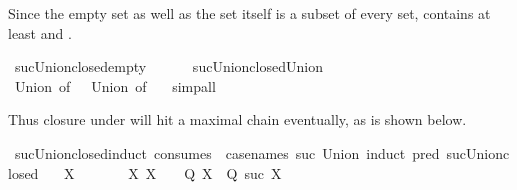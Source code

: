 \begin{isabellebody}
\begin{isamarkuptext}%
Since the empty set as well as the set itself is a subset of
  every set, \isa{{\isasymC}} contains at least \isa{{\isacharbraceleft}{\kern0pt}{\isacharbraceright}{\kern0pt}\ {\isasymin}\ {\isasymC}} and
  \isa{{\isasymUnion}\ {\isasymC}\ {\isasymin}\ {\isasymC}}.%
\end{isamarkuptext}\isamarkuptrue%
\isamarkupfalse%
\ suc{\isacharunderscore}{\kern0pt}Union{\isacharunderscore}{\kern0pt}closed{\isacharunderscore}{\kern0pt}empty{\isacharcolon}{\kern0pt}\ {\isachardoublequoteopen}{\isacharbraceleft}{\kern0pt}{\isacharbraceright}{\kern0pt}\ {\isasymin}\ {\isasymC}{\isachardoublequoteclose}\isanewline
\ \ \ suc{\isacharunderscore}{\kern0pt}Union{\isacharunderscore}{\kern0pt}closed{\isacharunderscore}{\kern0pt}Union{\isacharcolon}{\kern0pt}\ {\isachardoublequoteopen}{\isasymUnion}{\isasymC}\ {\isasymin}\ {\isasymC}{\isachardoublequoteclose}\isanewline
%
\isadelimproof
\ \ %
\endisadelimproof
%
\isatagproof
{}\isamarkupfalse%
\ Union\ {\isacharbrackleft}{\kern0pt}of\ {\isachardoublequoteopen}{\isacharbraceleft}{\kern0pt}{\isacharbraceright}{\kern0pt}{\isachardoublequoteclose}{\isacharbrackright}{\kern0pt}\ \ Union\ {\isacharbrackleft}{\kern0pt}of\ {\isachardoublequoteopen}{\isasymC}{\isachardoublequoteclose}{\isacharbrackright}{\kern0pt}\ \isamarkupfalse%
\ simp{\isacharunderscore}{\kern0pt}all%
\endisatagproof
{\isafoldproof}%
%
\isadelimproof
%
\endisadelimproof
%
\begin{isamarkuptext}%
Thus closure under  will hit a maximal chain
  eventually, as is shown below.%
\end{isamarkuptext}\isamarkuptrue%
\isamarkupfalse%
\ suc{\isacharunderscore}{\kern0pt}Union{\isacharunderscore}{\kern0pt}closed{\isacharunderscore}{\kern0pt}induct\ {\isacharbrackleft}{\kern0pt}consumes\ {}{\isacharcomma}{\kern0pt}\ case{\isacharunderscore}{\kern0pt}names\ suc\ Union{\isacharcomma}{\kern0pt}\ induct\ pred{\isacharcolon}{\kern0pt}\ suc{\isacharunderscore}{\kern0pt}Union{\isacharunderscore}{\kern0pt}closed{\isacharbrackright}{\kern0pt}{\isacharcolon}{\kern0pt}\isanewline
\ \ \ {\isachardoublequoteopen}X\ {\isasymin}\ {\isasymC}{\isachardoublequoteclose}\isanewline
\ \ \ \ \ {\isachardoublequoteopen}{\isasymAnd}X{\isachardot}{\kern0pt}\ X\ {\isasymin}\ {\isasymC}\ {\isasymLongrightarrow}\ Q\ X\ {\isasymLongrightarrow}\ Q\ {\isacharparenleft}{\kern0pt}suc\ X{\isacharparenright}{\kern0pt}{\isachardoublequoteclose}\isanewline

\end{isabellebody}
